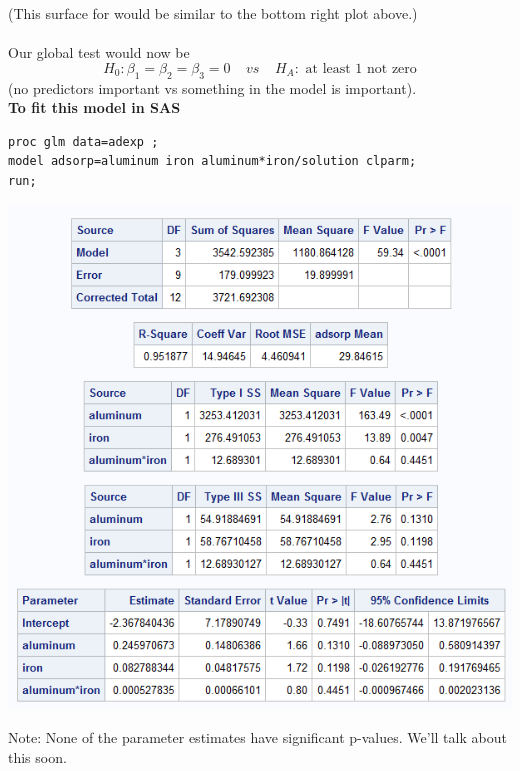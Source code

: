 (This surface for would be similar to the bottom right plot above.)  \\~\\

Our global test would now be 
$$H_0:\beta_1=\beta_2=\beta_3=0~~~~~vs~~~~~H_A:\mbox{ at least 1 not zero}$$
(no predictors important vs something in the model is important).\\

\textbf{To fit this model in SAS}
\begin{small}
\begin{verbatim}
proc glm data=adexp ;
model adsorp=aluminum iron aluminum*iron/solution clparm;
run;
\end{verbatim}
\end{small}

\begin{flushleft}
\includegraphics[scale=0.65]{adsorptioninteraction}\\
\end{flushleft}

Note:  None of the parameter estimates have significant p-values.  We'll talk about this soon.

\newpage


